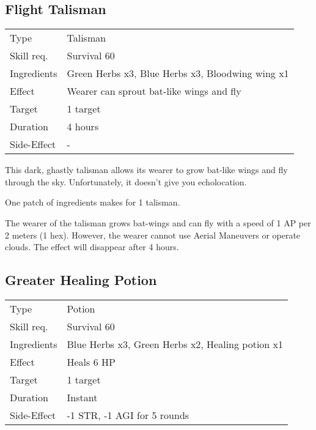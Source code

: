 \documentclass[11pt,a4paper,twocolumn]{book}
\begin{document}
\vfill

\subsection*{Flight Talisman}
{
	\begin{tabu} to 75mm{| X[l,4] | X[l,8] |}
		\hline
		Type 			& Talisman 													\\
		Skill req.	    & Survival 60 												\\
		Ingredients     & Green Herbs x3, Blue Herbs x3, Bloodwing wing x1			\\
		Effect     		& Wearer can sprout bat-like wings and fly 					\\
		Target      	& 1 target													\\
		Duration  		& 4 hours	 												\\
		Side-Effect     & -															\\ \hline
	\end{tabu}
	
}

\medskip

This dark, ghastly talisman allows its wearer to grow bat-like wings and fly through the sky. Unfortunately, it doesn't give you echolocation.

One patch of ingredients makes for 1 talisman.

The wearer of the talisman grows bat-wings and can fly with a speed of 1 AP per 2 meters (1 hex). However, the wearer cannot use Aerial Maneuvers or operate clouds. The effect will disappear after 4 hours.

\vfill


\subsection*{Greater Healing Potion}
{
	\begin{tabu} to 75mm{| X[l,4] | X[l,8] |}
		\hline
		Type 			& Potion 													\\
		Skill req.	    & Survival 60 												\\
		Ingredients     & Blue Herbs x3, Green Herbs x2, Healing potion x1			\\
		Effect     		& Heals 6 HP 												\\
		Target      	& 1 target													\\
		Duration  		& Instant	 												\\
		Side-Effect     & -1 STR, -1 AGI for 5 rounds								\\ \hline
	\end{tabu}	
}
\end{document}
